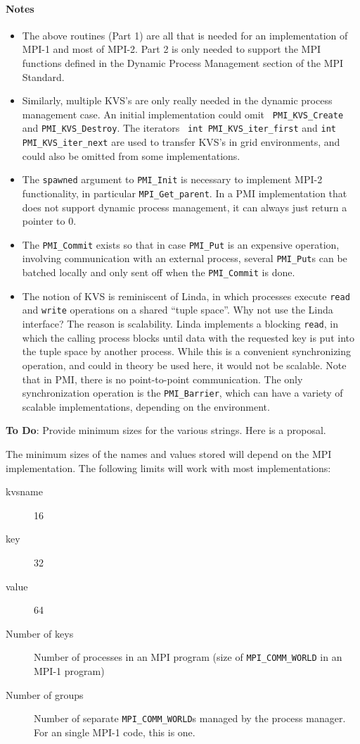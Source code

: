 \documentclass[11pt]{article}
\begin{document}
\paragraph{Notes}
\begin{itemize}
\item The above routines (Part 1) are all that is needed for an
  implementation of MPI-1 and most of MPI-2.  Part 2 is only needed to
  support the MPI functions defined in the Dynamic Process Management
  section of the MPI Standard.
\item Similarly, multiple KVS's are only really needed in the dynamic
  process management case.  An initial implementation could omit {\tt
    PMI\_KVS\_Create} and {\tt PMI\_KVS\_Destroy}.  The iterators {\tt
    int PMI\_KVS\_iter\_first} and {\tt int PMI\_KVS\_iter\_next} are used to
  transfer KVS's in grid environments, and could also be omitted from
  some implementations.
\item The {\tt spawned} argument to {\tt PMI\_Init} is necessary to
  implement MPI-2 functionality, in particular {\tt MPI\_Get\_parent}.
  In a PMI implementation that does not support dynamic process
  management, it can always just return a pointer to 0.
\item The {\tt PMI\_Commit} exists so that in case {\tt PMI\_Put} is an
  expensive operation, involving communication with an external process,
  several {\tt PMI\_Put}s can be batched locally and only sent off when
  the {\tt PMI\_Commit} is done.
\item The notion of KVS is reminiscent of Linda, in which processes
  execute {\tt read} and {\tt write} operations on a shared ``tuple
  space''.  Why not use the Linda interface?  The reason is scalability.
  Linda implements a blocking {\tt read}, in which the calling process blocks
  until data with the requested key is put into the tuple space by
  another process.  While this is a convenient synchronizing operation,
  and could in theory be used here, it would not be scalable.  Note that
  in PMI, there is no point-to-point communication.  The only
  synchronization operation is the {\tt PMI\_Barrier}, which can have a
  variety of scalable implementations, depending on the environment.
\end{itemize}

\textbf{To Do}: Provide minimum sizes for the various strings.  Here
is a proposal.

The minimum sizes of the names and values stored will depend on the
MPI implementation.  The following limits will work with most
implementations:
\begin{description}
\item[kvsname]16
\item[key]32
\item[value]64
\item[Number of keys]Number of processes in an MPI program (size of
  \texttt{MPI\_COMM\_WORLD} in an MPI-1 program)
\item[Number of groups]Number of separate \texttt{MPI\_COMM\_WORLD}s
  managed by the process manager.  For an single MPI-1 code, this is one.
\end{description}
\end{document}
